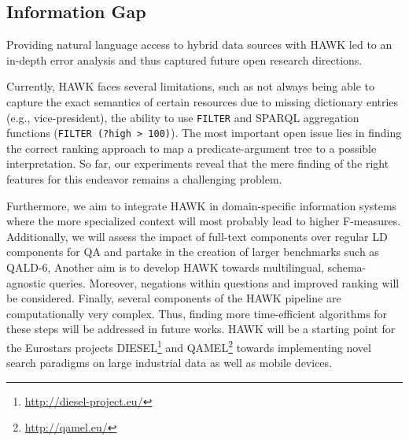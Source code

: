 \subsection*{Information Gap}

Providing natural language access to hybrid data sources with HAWK led to an in-depth error analysis and thus captured future open research directions.

Currently, HAWK faces several limitations, such as not always being able to capture the exact semantics of certain resources due to missing dictionary entries (e.g., vice-president), the ability to use \texttt{FILTER} and SPARQL aggregation functions (\texttt{FILTER (?high > 100)}). 
The most important open issue lies in finding the correct ranking approach to map a predicate-argument tree to a possible interpretation. 
So far, our experiments reveal that the mere finding of the right features for this endeavor remains a challenging problem. 

Furthermore, we aim to integrate HAWK in domain-specific information systems where the more specialized context will most probably lead to higher F-measures. 
Additionally, we will assess the impact of full-text components over regular LD components for \ac{QA} and partake in the creation of larger benchmarks such as \ac{QALD}-6,
Another aim is to develop HAWK towards multilingual, schema-agnostic queries.
Moreover, negations within questions and improved ranking will  be considered. 
Finally, several components of the HAWK pipeline are computationally very complex. 
Thus, finding more time-efficient algorithms for these steps will be addressed in future works.
HAWK will be a starting point for the Eurostars projects DIESEL\footnote{\url{http://diesel-project.eu/}} and QAMEL\footnote{\url{http://qamel.eu/}} towards implementing novel search paradigms on large industrial data as well as mobile devices.

\bigskip

